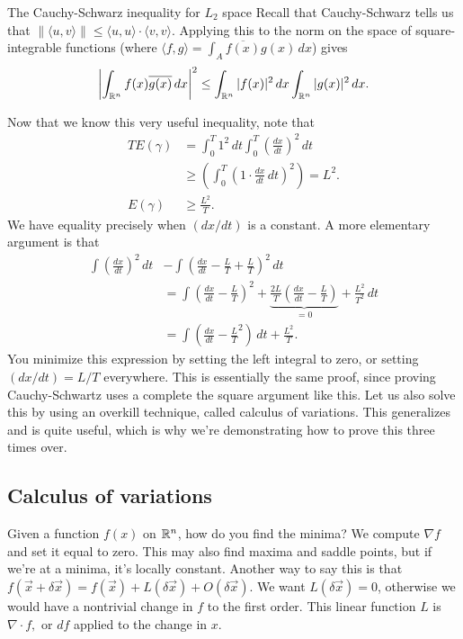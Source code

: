 \begin{namedthing}{The Cauchy-Schwarz inequality for $L_2$ space} 
    Recall that Cauchy-Schwarz tells us that $\|\langle u,v \rangle \|\leq \langle u,u \rangle \cdot \langle v,v \rangle $. Applying this to the norm on the space of square-integrable functions (where $\langle f,g \rangle =\int _A \overline{f(x)}g(x) \, dx$) gives \[
       \left| \int_{\mathbb{R}^n }^{}f(x) \overline{g(x)}  \, dx \right| ^2 \leq \int_{\mathbb{R}^n }^{} |f(x)|^2  \, dx \int_{\mathbb{R}^n }^{} |g(x)|^2  \, dx.
   \] 
\end{namedthing}
Now that we know this very useful inequality, note that
\begin{align*}
    T E(\gamma )&=\int_{0}^{T} 1^2 \, dt \int_{0}^{T} \left( \frac{dx}{dt} \right) ^2 \, dt\\
                &\geq \left( \int_{0}^{T}  \left( 1 \cdot \frac{dx}{dt} \, dt\right)  ^2 \right) =L^2.\\
    E(\gamma )&\geq \frac{L^2}{T}.
\end{align*}We have equality precisely when $(dx /dt)$ is a constant. A more elementary argument is that
\begin{align*}
    \int \left( \frac{dx}{dt} \right) ^2 \, dt &- \int \left( \frac{dx}{dt}-\frac{L}{T}+\frac{L}{T} \right) ^2 \, dt\\
                                               &= \int \left( \frac{dx}{dt}-\frac{L}{T} \right) ^2+\underset{=0}{\underbrace{ \frac{2L}{T}\left( \frac{dx}{dt}-\frac{L}{T} \right)} } +\frac{L^2}{T^2} \, dt\\
                                               &= \int \left( \frac{dx}{dt}-\frac{L}{T}^2 \right)  \, dt+\frac{L^2}{T}.
\end{align*}You minimize this expression by setting the left integral to zero, or setting $(dx /dt)=L /T$ everywhere. This is essentially the same proof, since proving Cauchy-Schwartz uses a complete the square argument like this. Let us also solve this by using an overkill technique, called calculus of variations. This generalizes and is quite useful, which is why we're demonstrating how to prove this three times over.

\subsection{Calculus of variations}
Given a function $f(x)$ on $\mathbb{R}^n $, how do you find the minima? We compute $\nabla f$ and set it equal to zero. This may also find maxima and saddle points, but if we're at a minima, it's locally constant. Another way to say this is that $f(\vec x+\delta \vec x)=f(\vec x)+L(\delta \vec x)+O(\delta \vec x)$. We want $L(\delta \vec x)=0$, otherwise we would have a nontrivial change in $f$ to the first order. This linear function $L$ is $\nabla \cdot f,$ or $df$ applied to the change in $x$.

